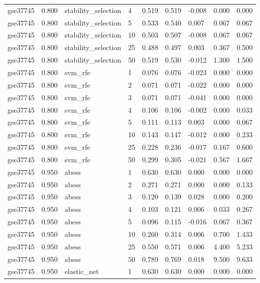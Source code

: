 \begin{table}[t]
\begin{tabular}{lllllllll}
    gse37745 & 0.800 & stability\_selection & 4 & 0.519 & 0.519 & -0.008 & 0.000 & 0.000 \\
    gse37745 & 0.800 & stability\_selection & 5 & 0.533 & 0.540 & 0.007 & 0.067 & 0.067 \\
    gse37745 & 0.800 & stability\_selection & 10 & 0.503 & 0.507 & -0.008 & 0.067 & 0.067 \\
    gse37745 & 0.800 & stability\_selection & 25 & 0.488 & 0.497 & 0.003 & 0.367 & 0.500 \\
    gse37745 & 0.800 & stability\_selection & 50 & 0.519 & 0.530 & -0.012 & 1.300 & 1.500 \\
    gse37745 & 0.800 & svm\_rfe & 1 & 0.076 & 0.076 & -0.023 & 0.000 & 0.000 \\
    gse37745 & 0.800 & svm\_rfe & 2 & 0.071 & 0.071 & -0.022 & 0.000 & 0.000 \\
    gse37745 & 0.800 & svm\_rfe & 3 & 0.071 & 0.071 & -0.041 & 0.000 & 0.000 \\
    gse37745 & 0.800 & svm\_rfe & 4 & 0.106 & 0.106 & -0.002 & 0.000 & 0.033 \\
    gse37745 & 0.800 & svm\_rfe & 5 & 0.111 & 0.113 & 0.003 & 0.000 & 0.067 \\
    gse37745 & 0.800 & svm\_rfe & 10 & 0.143 & 0.147 & -0.012 & 0.000 & 0.233 \\
    gse37745 & 0.800 & svm\_rfe & 25 & 0.228 & 0.236 & -0.017 & 0.167 & 0.600 \\
    gse37745 & 0.800 & svm\_rfe & 50 & 0.299 & 0.305 & -0.021 & 0.567 & 1.667 \\
    gse37745 & 0.950 & abess & 1 & 0.630 & 0.630 & 0.000 & 0.000 & 0.000 \\
    gse37745 & 0.950 & abess & 2 & 0.271 & 0.271 & 0.000 & 0.000 & 0.133 \\
    gse37745 & 0.950 & abess & 3 & 0.120 & 0.139 & 0.028 & 0.000 & 0.200 \\
    gse37745 & 0.950 & abess & 4 & 0.103 & 0.121 & 0.006 & 0.033 & 0.267 \\
    gse37745 & 0.950 & abess & 5 & 0.096 & 0.115 & -0.016 & 0.067 & 0.367 \\
    gse37745 & 0.950 & abess & 10 & 0.260 & 0.314 & 0.006 & 0.700 & 1.433 \\
    gse37745 & 0.950 & abess & 25 & 0.550 & 0.571 & 0.006 & 4.400 & 5.233 \\
    gse37745 & 0.950 & abess & 50 & 0.789 & 0.769 & 0.018 & 9.500 & 9.633 \\
    gse37745 & 0.950 & elastic\_net & 1 & 0.630 & 0.630 & 0.000 & 0.000 & 0.000 \\

\end{tabular}
\end{table}
